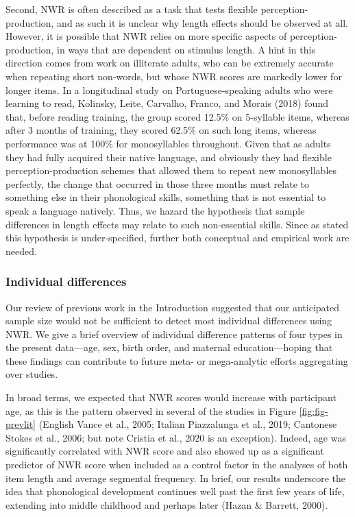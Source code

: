 \documentclass[english,,man,floatsintext]{apa6}
\begin{document}
Second, NWR is often described as a task that tests flexible perception-production, and as such it is unclear why length effects should be observed at all. However, it is possible that NWR relies on more specific aspects of perception-production, in ways that are dependent on stimulus length. A hint in this direction comes from work on illiterate adults, who can be extremely accurate when repeating short non-words, but whose NWR scores are markedly lower for longer items. In a longitudinal study on Portuguese-speaking adults who were learning to read, Kolinsky, Leite, Carvalho, Franco, and Morais (2018) found that, before reading training, the group scored 12.5\% on 5-syllable items, whereas after 3 months of training, they scored 62.5\% on such long items, whereas performance was at 100\% for monosyllables throughout. Given that as adults they had fully acquired their native language, and obviously they had flexible perception-production schemes that allowed them to repeat new monosyllables perfectly, the change that occurred in those three months must relate to something else in their phonological skills, something that is not essential to speak a language natively. Thus, we hazard the hypothesis that sample differences in length effects may relate to such non-essential skills. Since as stated this hypothesis is under-specified, further both conceptual and empirical work are needed.

\hypertarget{individual-differences}{%
\subsubsection{Individual differences}\label{individual-differences}}

Our review of previous work in the Introduction suggested that our anticipated sample size would not be sufficient to detect most individual differences using NWR. We give a brief overview of individual difference patterns of four types in the present data---age, sex, birth order, and maternal education---hoping that these findings can contribute to future meta- or mega-analytic efforts aggregating over studies.

In broad terms, we expected that NWR scores would increase with participant age, as this is the pattern observed in several of the studies in Figure \ref{fig:fig-prevlit} (English Vance et al., 2005; Italian Piazzalunga et al., 2019; Cantonese Stokes et al., 2006; but note Cristia et al., 2020 is an exception). Indeed, age was significantly correlated with NWR score and also showed up as a significant predictor of NWR score when included as a control factor in the analyses of both item length and average segmental frequency. In brief, our results underscore the idea that phonological development continues well past the first few years of life, extending into middle childhood and perhaps later (Hazan \& Barrett, 2000).
\end{document}
